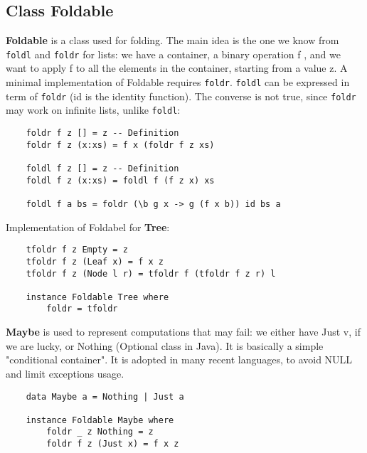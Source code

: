 \subsection{Class Foldable}
\textbf{Foldable} is a class used for folding.
The main idea is the one we know from \texttt{foldl} and \texttt{foldr} for lists: we have a container, a binary operation f , and we want to apply f to all the elements in the container, starting from a value z.
A minimal implementation of Foldable requires \texttt{foldr}.
\texttt{foldl} can be expressed in term of \texttt{foldr} (id is the identity function).
The converse is not true, since \texttt{foldr} may work on infinite lists, unlike \texttt{foldl}:
\begin{lstlisting}
	foldr f z [] = z -- Definition
	foldr f z (x:xs) = f x (foldr f z xs)
	
	foldl f z [] = z -- Definition
	foldl f z (x:xs) = foldl f (f z x) xs
	
	foldl f a bs = foldr (\b g x -> g (f x b)) id bs a
\end{lstlisting}
Implementation of Foldabel for \textbf{Tree}:
\begin{lstlisting}
	tfoldr f z Empty = z
	tfoldr f z (Leaf x) = f x z
	tfoldr f z (Node l r) = tfoldr f (tfoldr f z r) l
	
	instance Foldable Tree where
		foldr = tfoldr
\end{lstlisting}
\textbf{Maybe} is used to represent computations that may fail: we either have Just v, if we are lucky, or Nothing (Optional class in Java).
It is basically a simple "conditional container".
It is adopted in many recent languages, to avoid NULL and limit exceptions usage.
\begin{lstlisting}
	data Maybe a = Nothing | Just a
	
	instance Foldable Maybe where
		foldr _ z Nothing = z
		foldr f z (Just x) = f x z
\end{lstlisting}

